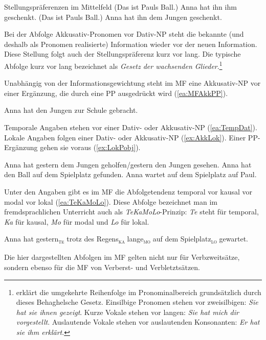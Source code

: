 \begin{Exkurs}{Stellungspräferenzen im Mittelfeld}
\ea 
\ea \label{ea:MFAkkPrnDat} (Das ist Pauls Ball.) Anna hat ihn ihm geschenkt.
\ex \label{exMFAkkPrnDatNP} (Das ist Pauls Ball.) Anna hat ihn dem Jungen geschenkt.
\z
\z 

Bei der Abfolge Akkusativ-Pronomen vor Dativ-NP steht die bekannte (und deshalb als Pronomen realisierte) Information wieder vor der neuen Information. Diese Stellung folgt auch der Stellungspräferenz kurz vor lang. Die typische Abfolge kurz vor lang bezeichnet \citet[6]{Behaghel1932SyntaxStellung} als \textit{Gesetz der wachsenden Glieder}.\footnote{\citet[137]{Wegener1995} erklärt die umgekehrte Reihenfolge im Pronominalbereich grundsätzlich durch dieses Behaghelsche Gesetz. Einsilbige Pronomen stehen vor zweisilbigen: \textit{Sie hat sie ihnen gezeigt}. Kurze Vokale stehen vor langen: \textit{Sie hat mich dir vorgestellt}. Auslautende Vokale stehen vor auslautenden Konsonanten: \textit{Er hat sie ihm erklärt}.} 

Unabhängig von der Informationsgewichtung steht im MF eine Akkusativ-NP vor einer Ergänzung, die durch eine PP ausgedrückt wird (\ref{ea:MFAkkPP}).

\ea \label{ea:MFAkkPP} Anna hat den Jungen zur Schule gebracht.
\z 

Temporale Angaben stehen vor einer Dativ- oder Akkusativ-NP (\ref{ea:TempDat}). Lokale Angaben folgen einer Dativ- oder Akkusativ-NP (\ref{ex:AkkLok}). Einer PP-Ergänzung gehen sie voraus (\ref{ex:LokPobj}).

\ea 
\ea \label{ea:TempDat} Anna hat gestern dem Jungen geholfen/gestern den Jungen gesehen.
\ex \label{ex:AkkLok} Anna hat den Ball auf dem Spielplatz gefunden.
\ex \label{ex:LokPobj} Anna wartet auf dem Spielplatz auf Paul.
\z 
\z 

Unter den Angaben gibt es im MF die Abfolgetendenz temporal vor kausal vor modal vor lokal (\ref{ea:TeKaMoLo}). Diese Abfolge bezeichnet man im fremdsprachlichen Unterricht auch als \textit{TeKaMoLo}-Prinzip: \textit{Te} steht für temporal, \textit{Ka} für kausal, \textit{Mo} für modal und \textit{Lo} für lokal.

\ea \label{ea:TeKaMoLo} Anna hat gestern\textsubscript{\textsc{te}} trotz des Regens\textsubscript{\textsc{ka}} lange\textsubscript{\textsc{mo}} auf dem Spielplatz\textsubscript{\textsc{lo}} gewartet.
\z 

Die hier dargestellten Abfolgen im MF gelten nicht nur für Verbzweitsätze, sondern ebenso für die MF von Verberst- und Verbletztsätzen.

\end{Exkurs}


